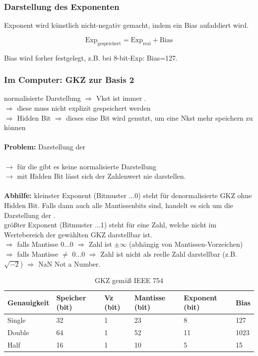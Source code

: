 \documentclass[10pt,a4paper]{scrartcl}
\begin{document}
\subsubsection*{Darstellung des Exponenten}
Exponent wird \glqq künstlich\grqq{} nicht-negativ gemacht, indem ein Bias aufaddiert wird.

$$
\text{Exp}_{\text{gespeichert}} = \text{Exp}_{\text{real}} + \text{Bias}
$$

Bias wird forher festgelegt, z.B. bei 8-bit-Exp: Bias=127.

\subsubsection*{Im Computer: \ac{GKZ} zur Basis 2}
normalisierte Darstellung $ \Rightarrow $ Vkst ist immer \grqq.\\
$ \Rightarrow $ diese \grqq{} muss nicht explizit gespeichert werden\\
$ \Rightarrow $ \glqq Hidden Bit\grqq
$ \Rightarrow $ dieses eine Bit wird genutzt, um eine Nkst mehr speichern zu können\\
\\
\indent \textbf{Problem:} Darstellung der \grqq{} 
\\\\
$ \rightarrow $ für die \grqq{} gibt es keine normalisierte Darstellung\\
$ \rightarrow $ mit \glqq Hidden Bit\grqq{} lässt sich der Zahlenwert \grqq{} nie darstellen.
\\\\
\textbf{Abhilfe:} kleinster Exponent (Bitmuster $\ldots$0\grqq) steht für denormalisierte \ac{GKZ} ohne Hidden Bit. Falls dann auch alle Mantissenbits \grqq{} sind, handelt es sich um die Darstellung der \grqq.\\
größter Exponent (Bitmuster $\ldots$1\grqq) steht für eine Zahl, welche nicht im Wertebereich der gewählten \ac{GKZ} darstellbar ist.\\
\indent $\Rightarrow$ falls Mantisse \glqq $0 \ldots 0$\grqq{} $\Rightarrow$ Zahl ist $\pm \infty$ (abhängig von Mantissen-Vorzeichen)\\
\indent $\Rightarrow$ falls Mantisse $\neq$ \glqq$0 \ldots 0$\grqq{} $\Rightarrow$ Zahl ist nicht als reelle Zahl darstellbar (z.B. $ \sqrt{-2} $) $\Rightarrow$ NaN \glqq Not a Number\grqq.\\

\begin{table}[h]
	\centering
	\begin{tabular}{l|l|l|l|l|l}
		Genauigkeit & Speicher (bit) & Vz (bit) & Mantisse (bit) & Exponent (bit) & Bias \\ \hline
		Single & 32 & 1 & 23 & 8 & 127\\
		Double & 64 & 1 & 52 & 11 & 1023 \\
		Half & 16 & 1 & 10 & 5 & 15\\
	\end{tabular}
\caption{\acl{GKZ} gemäß IEEE 754}
\end{table}
\end{document}
